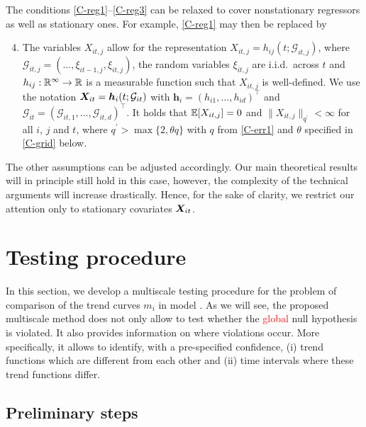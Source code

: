 \documentclass[a4paper,12pt]{article}
\makeatletter
\renewcommand{\eqref}[1]{\tagform@{\ref{#1}}}
\makeatother
\begin{document}
\begin{remark}
The conditions \ref{C-reg1}--\ref{C-reg3} can be relaxed to cover nonstationary regressors as well as stationary ones. For example, \ref{C-reg1} may then be replaced by
{\color{red}
\begin{enumerate}[label=(C\arabic*$^\ast$),leftmargin=1.15cm]
\setcounter{enumi}{3}
\item \label{C-reg1-star} The variables $X_{it,j}$ allow for the representation $X_{it,j} = h_{ij}(t; \mathcal{G}_{it,j})$, where $\mathcal{G}_{it,j} = (\ldots, \xi_{it-1,j}, \xi_{it,j})$, the random variables $\xi_{it,j}$ are i.i.d.\ across $t$ and $h_{ij}: \mathbb{R}^\infty \rightarrow \mathbb{R}$ is a measurable function such that $X_{it,j}$ is well-defined. We use the notation $\boldsymbol{X}_{it} = \boldsymbol{h}_{i}(t; \mathcal{G}_{it})$ with $\boldsymbol{h}_i = (h_{i1}, \ldots, h_{id})^\top$ and $\mathcal{G}_{it} = (\mathcal{G}_{it,1}, \ldots, \mathcal{G}_{it,d})^\top$. It holds that $\mathbb{E} [X_{it,j}]=0$ and $\| X_{it,j} \|_{q^\prime} <\infty$ for all $i$, $j$ and $t$, where $q^\prime > \max \{ 2, \theta q \}$ with $q$ from \ref{C-err1} and $\theta$ specified in \ref{C-grid} below.
\end{enumerate}}
The other assumptions can be adjusted accordingly. Our main theoretical results will in principle still hold in this case, however, the complexity of the technical arguments will increase drastically. Hence, for the sake of clarity, we restrict our attention only to stationary  covariates $\boldsymbol{X}_{it}$. 
\end{remark}


\section{Testing procedure}\label{sec:test}

In this section, we develop a multiscale testing procedure for the problem of comparison of the trend curves $m_i$ in model \eqref{eq:model_full}.  As we will see, the proposed multiscale method does not only allow to test whether the \textcolor{red}{global} null hypothesis is violated. It also provides information on where violations occur. More specifically, it allows to identify, with a pre-specified confidence, (i) trend functions which are different from each other and (ii) time intervals where these trend functions differ.

\subsection{Preliminary steps}\label{subsec:test:prep}
\end{document}
